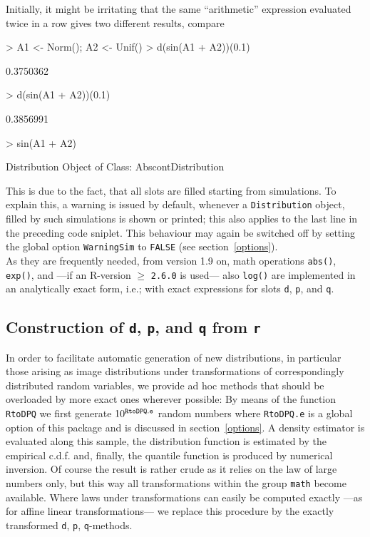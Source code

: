 \documentclass[11pt]{article}
\newcommand{\code}[1]{{\tt #1}}
\begin{document}
Initially, it might be irritating that the same ``arithmetic'' expression
evaluated twice in a row gives two different results, compare
\begin{Schunk}
\begin{Sinput}
>   A1 <- Norm(); A2 <- Unif()
>   d(sin(A1 + A2))(0.1)
\end{Sinput}
\begin{Soutput}
[1] 0.3750362
\end{Soutput}
\begin{Sinput}
>   d(sin(A1 + A2))(0.1)
\end{Sinput}
\begin{Soutput}
[1] 0.3856991
\end{Soutput}
\begin{Sinput}
>   sin(A1 + A2)
\end{Sinput}
\begin{Soutput}
Distribution Object of Class: AbscontDistribution
\end{Soutput}
\end{Schunk}
This is due to the fact, that all slots are filled starting from simulations.
To explain this, a warning is issued  by default, whenever a \code{Distribution}
object, filled by such simulations is shown or printed; this also applies to the 
last line in the preceding code sniplet. This behaviour may again be switched 
off by setting the global option
\code{WarningSim} to \code{FALSE} (see section~\ref{options}).\\

As they are frequently needed, from version 1.9 on, math operations 
\code{abs()}, \code{exp()}, and ---if an {\sf R}-version $\ge$ {\tt 2.6.0} is 
used--- also \code{log()} are implemented in an analytically exact form, 
i.e.; with exact expressions for slots \code{d}, \code{p}, and \code{q}.

%
\subsection{Construction of \code{d}, \code{p}, and \code{q} from \code{r}}
%
In order to facilitate automatic generation of new distributions, in particular 
those arising as image distributions under transformations of correspondingly 
distributed random variables, we provide ad hoc methods that should be 
overloaded by more exact ones wherever possible: By means of the function 
\code{RtoDPQ} we first generate $10^{\footnotesize\tt RtoDPQ.e}$
random numbers where \code{RtoDPQ.e} is a global option of this package and is 
discussed in section~{\ref{options}}. %
A density estimator is evaluated along this sample, the distribution function is 
estimated by the empirical c.d.f. and, finally, the quantile function is 
produced by numerical inversion.
Of course the result is rather crude as it relies on the law of large numbers 
only, but this way all transformations within the group \code{math} become 
available.
Where laws under transformations can easily be computed exactly ---as for affine
linear transformations--- we replace this procedure by the exactly transformed
\code{d}, \code{p}, \code{q}-methods.
%
\end{document}
